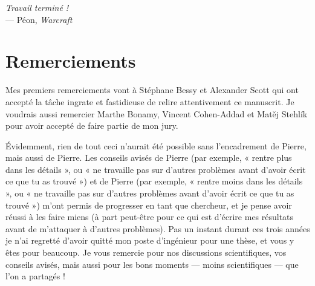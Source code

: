 







\begin{flushright}{\slshape    
Travail terminé !} \\ \medskip
--- Péon, \emph{Warcraft}
\end{flushright}
\smallskip


\begingroup

\let\clearpage\relax
\let\cleardoublepage\relax
\let\cleardoublepage\relax

\chapter*{Remerciements}

\bigskip

Mes premiers remerciements vont à Stéphane Bessy et Alexander Scott qui ont accepté la tâche ingrate et fastidieuse de relire attentivement ce manuscrit. Je voudrais aussi remercier Marthe Bonamy, Vincent Cohen-Addad et Matěj Stehlík pour avoir accepté de faire partie de mon jury.

\medskip

Évidemment, rien de tout ceci n'aurait été possible sans l'encadrement de Pierre, mais aussi de Pierre. Les conseils avisés de Pierre (par exemple, « rentre plus dans les détails », ou « ne travaille pas sur d'autres problèmes avant d'avoir écrit ce que tu as trouvé ») et de Pierre (par exemple, « rentre moins dans les détails », ou « ne travaille pas sur d'autres problèmes avant d'avoir écrit ce que tu as trouvé ») m'ont permis de progresser en tant que chercheur, et je pense avoir réussi à les faire miens (à part peut-être pour ce qui est d'écrire mes résultats avant de m'attaquer à d'autres problèmes). Pas un instant durant ces trois années je n'ai regretté d'avoir quitté mon poste d'ingénieur pour une thèse, et vous y êtes pour beaucoup. Je vous remercie pour nos discussions scientifiques, vos conseils avisés, mais aussi pour les bons moments — moins scientifiques — que l'on a partagés !

